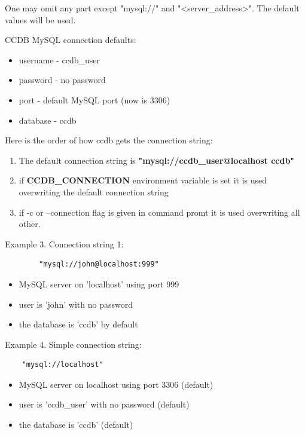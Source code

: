 \documentclass{article}
\begin{document}
One may omit any part except "mysql://" and "<server\_address>". The default
values will be used.

CCDB MySQL connection defaults:
\begin{itemize}
  \item username - ccdb\_user
  \item password - no password
  \item port - default MySQL port (now is 3306)
  \item database - ccdb
\end{itemize}


Here is the order of how ccdb gets the connection string:
\begin{enumerate}
  \item The default connection string is  \textbf{"mysql://ccdb\_user@localhost ccdb"}

  \item if \textbf{CCDB\_CONNECTION} environment variable is set it is used overwriting
        the default connection string

  \item if -c or --connection flag is given in command promt it is used overwriting
        all other.
\end{enumerate}

Example 3. Connection string 1:

\begin{verbatim}
        "mysql://john@localhost:999"
\end{verbatim}


\begin{itemize}
  \item MySQL server on 'localhost' using port 999
  \item user is 'john' with no password
  \item the database is 'ccdb' by default
\end{itemize}

Example 4. Simple connection string:
\begin{verbatim}	
	"mysql://localhost"
\end{verbatim}

\begin{itemize}
  \item MySQL server on localhost using port 3306 (default)
  \item user is 'ccdb\_user' with no password (default)
  \item the database is 'ccdb' (default)
\end{itemize}
\end{document}

